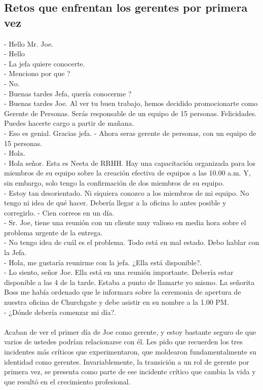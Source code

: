 \documentclass[10pt]{book}
\begin{document}
\subsection{Retos que enfrentan los gerentes por primera vez}
- Hello Mr. Joe.\\
- Hello\\
- La jefa quiere conocerte.\\
- Menciono por que ?\\
- No.\\
- Buenas tardes Jefa, quería conocerme ?\\
- Buenas tardes Joe. Al ver tu buen trabajo, hemos decidido promocionarte como Gerente de Personas. Serás responsable de un equipo de 15 personas. Felicidades. Puedes hacerte cargo a partir de mañana.\\
- Eso es genial. Gracias jefa.
- Ahora seras gerente de personas, con un equipo de 15 personas. \\
- Hola.\\
- Hola señor. Esta es Neeta de RRHH. Hay una capacitación organizada para los miembros de su equipo sobre la creación efectiva de equipos a las 10.00 a.m. Y, sin embargo, solo tengo la confirmación de dos miembros de su equipo.\\
- Estoy tan desorientado. Ni siquiera conozco a los miembros de mi equipo. No tengo ni idea de qué hacer. Debería llegar a la oficina lo antes posible y corregirlo.
- Cien correos en un día.\\
- Sr. Joe, tiene una reunión con un cliente muy valioso en media hora sobre el problema urgente de la entrega.\\
- No tengo idea de cuál es el problema. Todo está en mal estado. Debo hablar con la Jefa.\\
- Hola, me gustaría reunirme con la jefa. ¿Ella está disponible?.\\
- Lo siento, señor Joe. Ella está en una reunión importante. Debería estar disponible a las 4 de la tarde. Estaba a punto de llamarte yo mismo. La señorita Boss me había ordenado que le informara sobre la ceremonia de apertura de nuestra oficina de Churchgate y debe asistir en su nombre a la 1.00 PM.\\
- ¿Dónde debería comenzar mi día?.\\\\
Acaban de ver el primer día de Joe como gerente, y estoy bastante seguro de que varios de ustedes podrían relacionarse con él.  Les pido que recuerden los tres incidentes más críticos que experimentaron, que moldearon fundamentalmente su identidad como gerentes. Invariablemente, la transición a un rol de gerente por primera vez, se presenta como parte de ese incidente crítico que cambia la vida y que resultó en el crecimiento profesional.\\
\end{document}
